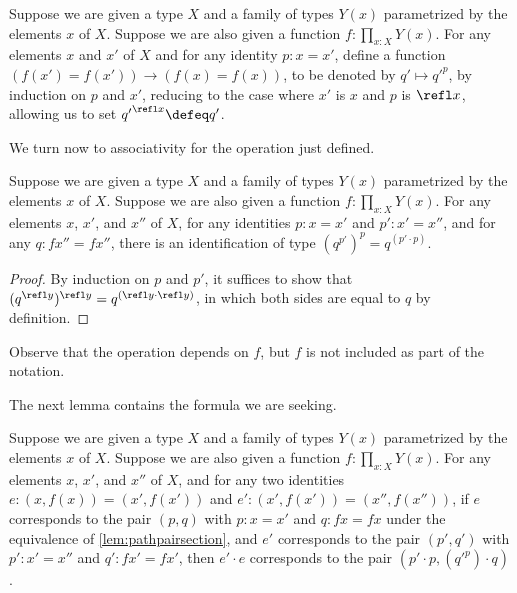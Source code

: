 \begin{definition}\label{def:pathsectionaction}
  Suppose we are given a type $X$ and a family of types $Y(x)$ parametrized by the elements $x$ of $X$.
  Suppose we are also given a function $f : \prod_{x:X} Y(x)$.
  For any elements $x$ and $x'$ of $X$ and for any identity $p : x = x'$, define a function $(f(x') = f(x')) \to (f(x) = f(x))$, to be denoted
  by $q' \mapsto {q'} ^ p$, by induction on $p$ and $x'$, reducing to the case where $x'$ is $x$ and $p$ is $\refl x$, allowing us to
  set ${q'} ^{ \refl x } \defeq q'$.
\end{definition}

We turn now to associativity for the operation just defined.

\begin{lemma}\label{def:pathsectionactionassoc}
  Suppose we are given a type $X$ and a family of types $Y(x)$ parametrized by the elements $x$ of $X$.
  Suppose we are also given a function $f : \prod_{x:X} Y(x)$.
  For any elements $x$, $x'$, and $x''$ of $X$, for any identities $p : x = x'$ and $p' : x' = x''$,
  and for any $q : f x'' = f x''$,
  there is an identification of type $ ( q ^{ p' }) ^ p = q ^{( p' \cdot p )}$.
\end{lemma}

\begin{proof}
  By induction on $p$ and $p'$, it suffices to show that $ ( q ^{ \refl y }) ^ { \refl y } = q ^{( \refl y \cdot \refl y )}$, in which both sides are
  equal to $q$ by definition.
\end{proof}

Observe that the operation depends on $f$, but $f$ is not included as part of the notation.

The next lemma contains the formula we are seeking.

\begin{lemma}\label{lem:pathpairsectionmult}
  Suppose we are given a type $X$ and a family of types $Y(x)$ parametrized by the elements $x$ of $X$.
  Suppose we are also given a function $f : \prod_{x:X} Y(x)$.
  For any elements $x$, $x'$, and $x''$ of $X$, and for any two identities $e : (x,f(x)) = (x',f(x'))$ and $e' : (x',f(x')) = (x'',f(x''))$,
  if $e$ corresponds to the pair $(p,q)$ with $p : x = x'$ and $q : f x = f x$ under the equivalence of \cref{lem:pathpairsection},
  and $e'$ corresponds to the pair $(p',q')$ with $p' : x' = x''$ and $q' : f x' = f x'$,
  then $e' \cdot e$ corresponds to the pair $(p' \cdot p , ({q'} ^ p) \cdot q)$.
\end{lemma}


